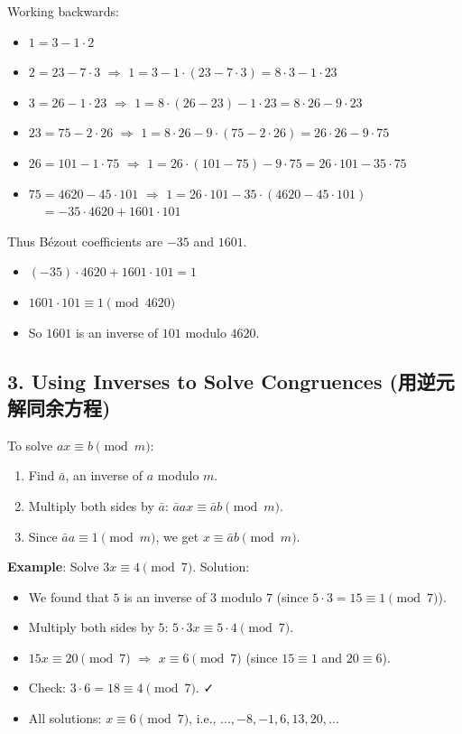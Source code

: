 \documentclass[10pt,a4paper,openany]{ctexbook}
\theoremstyle{definition}
\theoremstyle{remark}
\begin{document}
Working backwards:
\begin{itemize}
\item $1 = 3 - 1 \cdot 2$
\item $2 = 23 - 7 \cdot 3$ $\Rightarrow$ $1 = 3 - 1 \cdot (23 - 7 \cdot 3) = 8 \cdot 3 - 1 \cdot 23$
\item $3 = 26 - 1 \cdot 23$ $\Rightarrow$ $1 = 8 \cdot (26 - 23) - 1 \cdot 23 = 8 \cdot 26 - 9 \cdot 23$
\item $23 = 75 - 2 \cdot 26$ $\Rightarrow$ $1 = 8 \cdot 26 - 9 \cdot (75 - 2 \cdot 26) = 26 \cdot 26 - 9 \cdot 75$
\item $26 = 101 - 1 \cdot 75$ $\Rightarrow$ $1 = 26 \cdot (101 - 75) - 9 \cdot 75 = 26 \cdot 101 - 35 \cdot 75$
\item $75 = 4620 - 45 \cdot 101$ $\Rightarrow$ $1 = 26 \cdot 101 - 35 \cdot (4620 - 45 \cdot 101)$
$\quad = -35 \cdot 4620 + 1601 \cdot 101$


\end{itemize}

Thus B\'ezout coefficients are $-35$ and $1601$.
\begin{itemize}
\item $(-35) \cdot 4620 + 1601 \cdot 101 = 1$
\item $1601 \cdot 101 \equiv 1 \pmod{4620}$
\item So $1601$ is an inverse of $101$ modulo $4620$.

\end{itemize}

\vspace{-2pt}

\subsection{3. Using Inverses to Solve Congruences (用逆元解同余方程)}

To solve $ax \equiv b \pmod{m}$:
\begin{enumerate}
\item Find $\bar{a}$, an inverse of $a$ modulo $m$.
\item Multiply both sides by $\bar{a}$: $\bar{a}ax \equiv \bar{a}b \pmod{m}$.
\item Since $\bar{a}a \equiv 1 \pmod{m}$, we get $x \equiv \bar{a}b \pmod{m}$.

\end{enumerate}

\textbf{Example}: Solve $3x \equiv 4 \pmod{7}$.
Solution:
\begin{itemize}
\item We found that $5$ is an inverse of $3$ modulo $7$ (since $5 \cdot 3 = 15 \equiv 1 \pmod{7}$).
\item Multiply both sides by $5$: $5 \cdot 3x \equiv 5 \cdot 4 \pmod{7}$.
\item $15x \equiv 20 \pmod{7}$ $\Rightarrow$ $x \equiv 6 \pmod{7}$ (since $15 \equiv 1$ and $20 \equiv 6$).
\item Check: $3 \cdot 6 = 18 \equiv 4 \pmod{7}$. ✓
\item All solutions: $x \equiv 6 \pmod{7}$, i.e., $\dots, -8, -1, 6, 13, 20, \dots$

\end{itemize}
\end{document}
